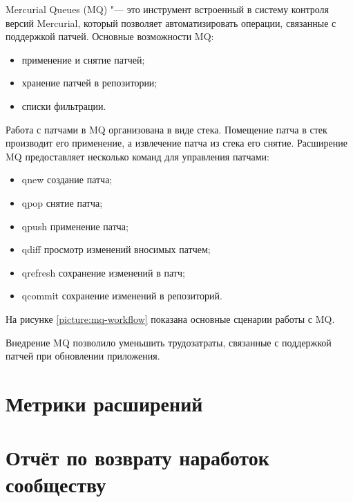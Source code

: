 Mercurial Queues (MQ) "--- это инструмент встроенный в систему контроля версий
Mercurial, который позволяет автоматизировать операции, связанные с поддержкой
патчей. Основные возможности MQ:
\begin{itemize}
  \item применение и снятие патчей;
  \item хранение патчей в репозитории;
  \item списки фильтрации.
\end{itemize}
Работа с патчами в MQ организована в виде стека. Помещение патча в стек
производит его применение, а извлечение патча из стека его снятие. Расширение
MQ предоставляет несколько команд для управления патчами:
\begin{itemize}
  \item qnew создание патча;
  \item qpop снятие патча;
  \item qpush применение патча;
  \item qdiff просмотр изменений вносимых патчем;
  \item qrefresh сохранение изменений в патч;
  \item qcommit сохранение изменений в репозиторий.
\end{itemize}


На рисунке \ref{picture:mq-workflow} показана основные сценарии работы с MQ. 

Внедрение MQ позволило уменьшить трудозатраты, связанные с поддержкой патчей
при обновлении приложения. 

\section{Метрики расширений}
\section{Отчёт по возврату наработок сообществу}


